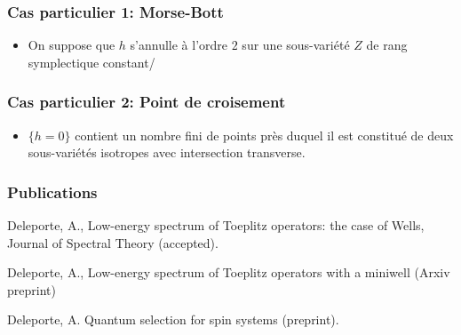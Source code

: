 \documentclass[mathserif]{beamer}
\begin{document}
\begin{frame}
  \frametitle{Cas particulier 1: Morse-Bott}
  \begin{itemize}
  \item On suppose que $h$ s'annulle à l'ordre $2$ sur une
    sous-variété $Z$ de rang symplectique constant/
  \end{itemize}
\end{frame}

\begin{frame}
  \frametitle{Cas particulier 2: Point de croisement}
  \begin{itemize}
  \item $\{h=0\}$ contient un nombre fini de points près duquel il est
    constitué de deux sous-variétés isotropes avec intersection transverse.
  \end{itemize}
\end{frame}

\begin{frame}
  \frametitle{Publications}
  Deleporte, A., Low-energy spectrum of Toeplitz operators: the case
  of Wells, Journal of Spectral Theory (accepted).
  \vspace{1em}
  
  Deleporte, A., Low-energy spectrum of Toeplitz operators with a
  miniwell (Arxiv preprint)
  \vspace{1em}
  
  Deleporte, A. Quantum selection for spin systems (preprint).
\end{frame}
\end{document}
